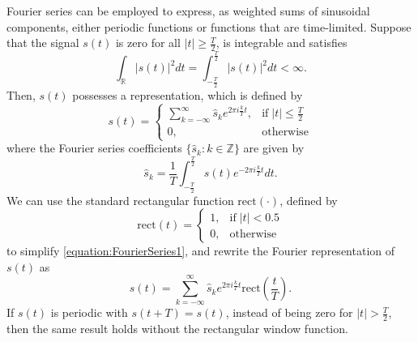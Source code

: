 Fourier series can be employed to express, as weighted sums of sinusoidal components, either periodic functions or functions that are time-limited.
Suppose that the signal $s(t)$ is zero for all $|t|\geq\frac{T}{2}$, is integrable and satisfies
\begin{equation*}
\int_{\mathbb{R}} |s(t)|^2 dt =
\int_{-\frac{T}{2}}^{\frac{T}{2}} |s(t)|^2 dt < \infty .
\end{equation*}
Then, $s(t)$ possesses a  representation, which is defined by
\begin{equation} \label{equation:FourierSeries1}
s(t) = \begin{cases} \sum_{k=-\infty}^{\infty}
\hat{s}_k e^{2 \pi i \frac{k}{T} t}, & \mathrm{if} \; |t| \leq \frac{T}{2} \\
0, & \text{otherwise} \end{cases}
\end{equation}
where the Fourier series coefficients $\{ \hat{s}_k : k \in \mathbb{Z} \}$ are given by
\begin{equation*}
\hat{s}_k = \frac{1}{T} \int_{-\frac{T}{2}}^{\frac{T}{2}}
s(t) e^{-2 \pi i \frac{k}{T} t} dt .
\end{equation*}
We can use the standard rectangular function $\mathrm{rect}(\cdot)$, defined by
\begin{equation} \label{equation:RectangularFunction}
\mathrm{rect} (t) = \begin{cases} 1, & \mathrm{if}\; |t| < 0.5 \\
0, & \text{otherwise} \end{cases}
\end{equation}
to simplify \eqref{equation:FourierSeries1}, and rewrite the Fourier representation of $s(t)$ as
\begin{equation} \label{equation:FourierSeries2}
s(t) = \sum_{k=-\infty}^{\infty}
\hat{s}_k e^{2 \pi i \frac{k}{T} t}
\mathrm{rect} \left( \frac{t}{T} \right) .
\end{equation}
If $s(t)$ is periodic with $s(t+T)=s(t)$, instead of being zero for $|t|>\frac{T}{2}$, then the same result holds without the rectangular window function.

